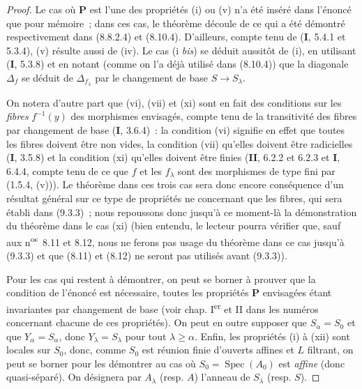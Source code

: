 \begin{proof}
Le cas où $\boldsymbol{P}$ est l'une des propriétés (i) ou (v) n'a été inséré dans
l'énoncé que pour mémoire~; dans ces cas, le théorème découle de ce qui a été
démontré respectivement dans (8.8.2.4) et (8.10.4). D'ailleurs, compte tenu de
(\textbf{I}, 5.4.1 et 5.3.4), (v) résulte aussi de (iv). Le cas (i \emph{bis}) se
déduit aussitôt de (i), en utilisant (\textbf{I}, 5.3.8) et en notant (comme on l'a
déjà utilisé dans (8.10.4)) que la diagonale $\Delta_f$ se déduit de
$\Delta_{f_\lambda}$ par le changement de base $S\to S_\lambda$.

On notera d'autre part que (vi), (vii) et (xi) sont en fait des conditions
sur les \emph{fibres} $f^{-1}(y)$ des morphismes envisagés, compte tenu de la
transitivité des fibres par changement de base (\textbf{I}, 3.6.4)~: la condition (vi)
signifie en effet que toutes les fibres doivent être non vides, la condition
(vii) qu'elles doivent être radicielles (\textbf{I}, 3.5.8) et la condition (xi)
qu'elles doivent être finies (\textbf{II}, 6.2.2 et 6.2.3 et \textbf{I}, 6.4.4, compte tenu de
ce que $f$ et les $f_\lambda$ sont des morphismes de type fini par (1.5.4,
(v))). Le théorème dans ces trois cas sera donc encore conséquence d'un
résultat général sur ce type de propriétés ne concernant que les fibres, qui
sera établi dans (9.3.3)~; nous repoussons donc jusqu'à ce moment-là la
démonstration du théorème dans le cas (xi) (bien entendu, le lecteur pourra
vérifier que, sauf aux n\textsuperscript{os}~8.11 et 8.12, nous ne ferons pas
usage du théorème dans ce cas jusqu'à (9.3.3) et que (8.11) et (8.12) ne
seront pas utilisés avant (9.3.3)).

Pour les cas qui restent à démontrer, on peut se borner à prouver que la
condition de l'énoncé est nécessaire, toutes les propriétés $\boldsymbol{P}$
envisagées étant invariantes par changement de base (voir chap. I\textsuperscript{er}
et II dans les numéros concernant chacune de ces propriétés). On peut en
outre supposer que $S_\alpha=S_0$ et que $Y_\alpha=S_\alpha$, donc
$Y_\lambda=S_\lambda$ pour tout $\lambda\geq\alpha$. Enfin, les propriétés
(i) à (xii) sont locales sur $S_0$, donc, comme $S_0$ est réunion finie
d'ouverts affines et $L$ filtrant, on peut se borner pour les démontrer au cas
où $S_0=\operatorname{Spec}(A_0)$ est \emph{affine} (donc quasi-séparé). On désignera
par $A_\lambda$ (resp. $A$) l'anneau de $S_\lambda$ (resp. $S$).


\end{proof}
